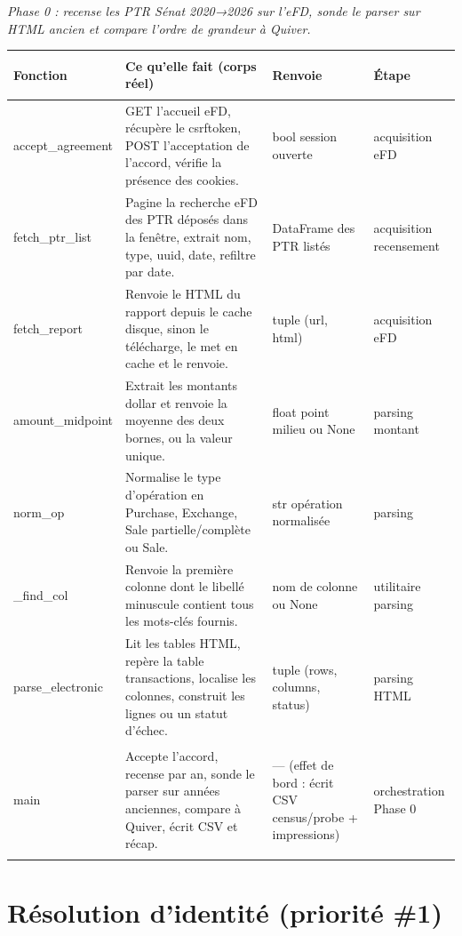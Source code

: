 \documentclass[11pt,a4paper]{article}
\makeatletter
\newenvironment{fnt}{%
  \par\footnotesize
  \setlength{\tabcolsep}{3pt}%
  \begin{longtable}{@{}>{\ttfamily\scriptsize\raggedright\arraybackslash}p{3.0cm} >{\raggedright\arraybackslash}p{7.5cm} >{\itshape\scriptsize\raggedright\arraybackslash}p{2.7cm} >{\scriptsize\raggedright\arraybackslash}p{1.85cm}@{}}
  \toprule
  \normalfont\bfseries\scriptsize Fonction & \bfseries\scriptsize Ce qu'elle fait (corps réel) &
  \normalfont\bfseries\scriptsize Renvoie & \normalfont\bfseries\scriptsize Étape\\
  \midrule\endhead
}{\bottomrule\end{longtable}\par}
\newcommand{\fnmod}[2]{\par\smallskip\noindent{\ttfamily\bfseries #1}\;\textmd{\itshape\small\textemdash{} #2}\par\nobreak\vspace{2pt}}
\makeatother
\begin{document}
\fnmod{census_probe.py}{Phase 0 : recense les PTR Sénat 2020→2026 sur l'eFD, sonde le parser sur HTML ancien et compare l'ordre de grandeur à Quiver.}
\begin{fnt}
accept_\allowbreak agreement & GET l'accueil eFD,\allowbreak{} récupère le csrftoken,\allowbreak{} POST l'acceptation de l'accord,\allowbreak{} vérifie la présence des cookies. & bool session ouverte & acquisition eFD \\
fetch_\allowbreak ptr_\allowbreak list & Pagine la recherche eFD des PTR déposés dans la fenêtre,\allowbreak{} extrait nom,\allowbreak{} type,\allowbreak{} uuid,\allowbreak{} date,\allowbreak{} refiltre par date. & DataFrame des PTR listés & acquisition recensement \\
fetch_\allowbreak report & Renvoie le HTML du rapport depuis le cache disque,\allowbreak{} sinon le télécharge,\allowbreak{} le met en cache et le renvoie. & tuple (url,\allowbreak{} html)\allowbreak{} & acquisition eFD \\
amount_\allowbreak midpoint & Extrait les montants dollar et renvoie la moyenne des deux bornes,\allowbreak{} ou la valeur unique. & float point milieu ou None & parsing montant \\
norm_\allowbreak op & Normalise le type d'opération en Purchase,\allowbreak{} Exchange,\allowbreak{} Sale partielle/\allowbreak{}complète ou Sale. & str opération normalisée & parsing \\
_\allowbreak find_\allowbreak col & Renvoie la première colonne dont le libellé minuscule contient tous les mots-clés fournis. & nom de colonne ou None & utilitaire parsing \\
parse_\allowbreak electronic & Lit les tables HTML,\allowbreak{} repère la table transactions,\allowbreak{} localise les colonnes,\allowbreak{} construit les lignes ou un statut d'échec. & tuple (rows,\allowbreak{} columns,\allowbreak{} status)\allowbreak{} & parsing HTML \\
main & Accepte l'accord,\allowbreak{} recense par an,\allowbreak{} sonde le parser sur années anciennes,\allowbreak{} compare à Quiver,\allowbreak{} écrit CSV et récap. & — (effet de bord : écrit CSV census/\allowbreak{}probe + impressions)\allowbreak{} & orchestration Phase 0 \\
\end{fnt}

\section{Résolution d'identité (priorité \#1)}
\label{sec:identite}
\end{document}
